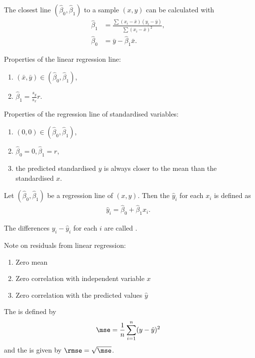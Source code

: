 \documentclass{article}
\begin{document}
\begin{theorem}
	The closest line $(\hat\beta_0,\hat\beta_1)$ to a sample $(x,y)$ can be calculated with
	\begin{align*}
		\hat\beta_1&=\frac{\sum(x_i-\bar x)(y_i-\bar y)}{\sum(x_i-\bar x)^2},\\
		\hat\beta_0&=\bar y - \hat\beta_1\bar x.
	\end{align*}
\end{theorem}
Properties of the linear regression line:
\begin{enumerate}
	\item $(\bar x, \bar y)\in(\hat\beta_0, \hat\beta_1)$,
	\item $\hat\beta_1 = \frac{s_y}{s_x}r$.
\end{enumerate}
Properties of the regression line of standardised variables:
\begin{enumerate}
	\item $(0,0)\in(\hat\beta_0,\hat\beta_1)$,
	\item $\hat\beta_0=0,\hat\beta_1=r$,
	\item the predicted standardised $y$ is always closer to the mean than the standardised $x$.
\end{enumerate}
\begin{definition}
	Let $(\hat\beta_0,\hat\beta_1)$ be a regression line of $(x,y)$. Then the
	 $\hat y_i$ for each $x_i$ is defined as
	\begin{align*}
		\hat y_i = \hat\beta_0 + \hat\beta_1 x_i.
	\end{align*}
\end{definition}
\begin{definition}
	The differences $y_i - \hat y_i$ for each $i$ are called .
\end{definition}
Note on residuals from linear regression:
\begin{enumerate}
	\item Zero mean
	\item Zero correlation with independent variable $x$
	\item Zero correlation with the predicted values $\hat y$
\end{enumerate}
\begin{definition}
	The  is defined by
	\begin{align*}
		\mse = \frac{1}{n}\sum_{i=1}^n (y-\hat y)^2
	\end{align*}
	and the  is given by $\rmse=\sqrt{\mse}$.
\end{definition}
\end{document}

